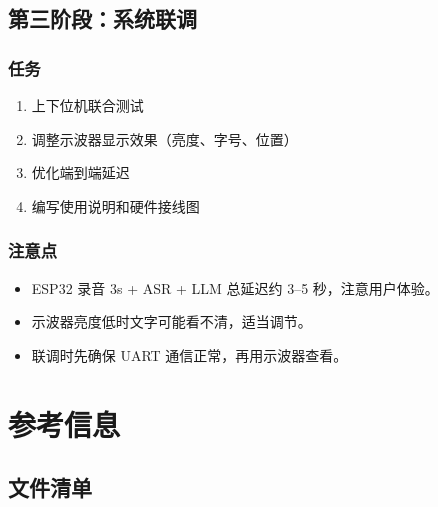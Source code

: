 \documentclass[12pt,a4paper,openany]{ctexbook}
\begin{document}
\section{第三阶段：系统联调}

\subsection*{任务}
\begin{enumerate}[leftmargin=2em, label=\textbf{\arabic*.}]
    \item 上下位机联合测试
    \item 调整示波器显示效果（亮度、字号、位置）
    \item 优化端到端延迟
    \item 编写使用说明和硬件接线图
\end{enumerate}

\subsection*{注意点}
\begin{itemize}
    \item ESP32 录音 3s + ASR + LLM 总延迟约 3--5 秒，注意用户体验。
    \item 示波器亮度低时文字可能看不清，适当调节。
    \item 联调时先确保 UART 通信正常，再用示波器查看。
\end{itemize}

\chapter{参考信息}

\section{文件清单}
\end{document}
